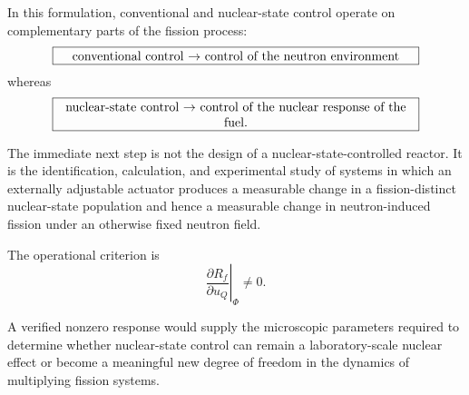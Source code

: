 In this formulation, conventional and nuclear-state control operate on complementary parts of the fission process:
\begin{equation}
\boxed{
\begin{minipage}{0.82\columnwidth}
\centering
conventional control $\rightarrow$ control of the neutron environment
\end{minipage}
}
\end{equation}
whereas
\begin{equation}
\boxed{
\begin{minipage}{0.82\columnwidth}
\centering
nuclear-state control $\rightarrow$ control of the nuclear response of the fuel.
\end{minipage}
}
\end{equation}

The immediate next step is not the design of a nuclear-state-controlled reactor. It is the identification, calculation, and experimental study of systems in which an externally adjustable actuator produces a measurable change in a fission-distinct nuclear-state population and hence a measurable change in neutron-induced fission under an otherwise fixed neutron field.

The operational criterion is
\begin{equation}
\boxed{
\left.
\frac{\partial R_f}
{\partial u_Q}
\right|_{\Phi}
\neq0.
}
\end{equation}

A verified nonzero response would supply the microscopic parameters required to determine whether nuclear-state control can remain a laboratory-scale nuclear effect or become a meaningful new degree of freedom in the dynamics of multiplying fission systems.
